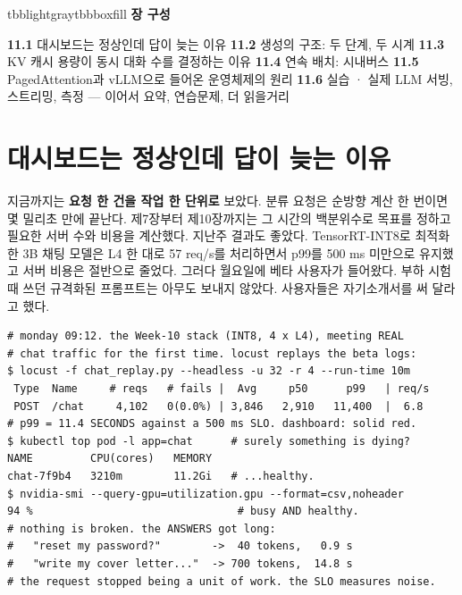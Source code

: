 \vspace{2.5pt}

\begin{calloutbox}{tbblightgray}{tbbboxfill}
{\normalsize\bfseries\color{tbbink}장 구성}\par\vspace{3pt}
\textbf{11.1} 대시보드는 정상인데 답이 늦는 이유    \textbf{11.2} 생성의 구조: 두 단계, 두 시계    \textbf{11.3} KV 캐시 용량이 동시 대화 수를 결정하는 이유    \textbf{11.4} 연속 배치: 시내버스    \textbf{11.5} PagedAttention과 vLLM으로 들어온 운영체제의 원리    \textbf{11.6} 실습 · 실제 LLM 서빙, 스트리밍, 측정 — 이어서 요약, 연습문제, 더 읽을거리
\end{calloutbox}

\section{대시보드는 정상인데 답이 늦는 이유}

지금까지는 \textbf{요청 한 건을 작업 한 단위로} 보았다. 분류 요청은 순방향 계산 한 번이면 몇 밀리초 만에 끝난다. 제7장부터 제10장까지는 그 시간의 백분위수로 목표를 정하고 필요한 서버 수와 비용을 계산했다. 지난주 결과도 좋았다. TensorRT-INT8로 최적화한 3B 채팅 모델은 L4 한 대로 57 req/s를 처리하면서 p99를 500 ms 미만으로 유지했고 서버 비용은 절반으로 줄었다. 그러다 월요일에 베타 사용자가 들어왔다. 부하 시험 때 쓰던 규격화된 프롬프트는 아무도 보내지 않았다. 사용자들은 자기소개서를 써 달라고 했다.

\begin{terminalbox}
\begin{Verbatim}[breaklines=true,breakanywhere=true,fontsize=\small,formatcom=\color{tbbtermfg},codes=\tbbcodeactive]
# monday 09:12. the Week-10 stack (INT8, 4 x L4), meeting REAL
# chat traffic for the first time. locust replays the beta logs:
$ locust -f chat_replay.py --headless -u 32 -r 4 --run-time 10m
 Type  Name     # reqs   # fails |  Avg     p50      p99   | req/s
 POST  /chat     4,102   0(0.0%) | 3,846   2,910   11,400  |  6.8
# p99 = 11.4 SECONDS against a 500 ms SLO. dashboard: solid red.
$ kubectl top pod -l app=chat      # surely something is dying?
NAME         CPU(cores)   MEMORY
chat-7f9b4   3210m        11.2Gi   # ...healthy.
$ nvidia-smi --query-gpu=utilization.gpu --format=csv,noheader
94 %                                # busy AND healthy.
# nothing is broken. the ANSWERS got long:
#   "reset my password?"        ->  40 tokens,   0.9 s
#   "write my cover letter..."  -> 700 tokens,  14.8 s
# the request stopped being a unit of work. the SLO measures noise.
\end{Verbatim}
\end{terminalbox}


